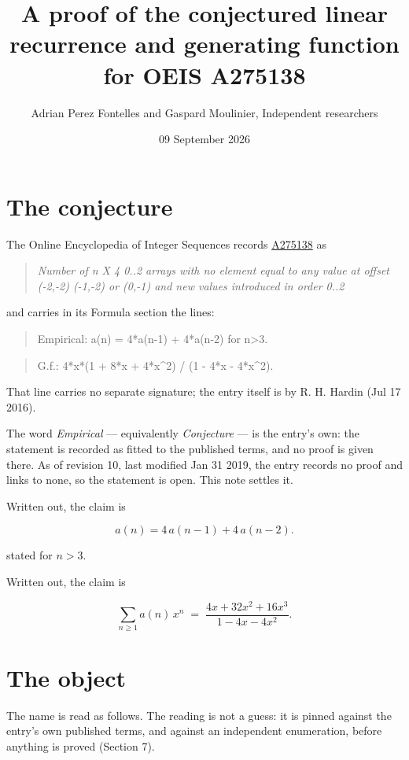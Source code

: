\documentclass[11pt]{article}
\title{A proof of the conjectured linear recurrence and generating function for OEIS A275138}
\author{Adrian Perez Fontelles and Gaspard Moulinier, Independent researchers}
\date{09 September 2026}
\theoremstyle{definition}
\begin{document}
\maketitle
\section{The conjecture}

The Online Encyclopedia of Integer Sequences records \href{https://oeis.org/A275138}{A275138} as

\begin{quote}\itshape Number of n X 4 0..2 arrays with no element equal to any value at offset (-2,-2) (-1,-2) or (0,-1) and new values introduced in order 0..2\end{quote}

and carries in its Formula section the lines:

\begin{quote}\ttfamily Empirical: a(n) = 4*a(n-1) + 4*a(n-2) for n>3.\end{quote}

\begin{quote}\ttfamily G.f.: 4*x*(1 + 8*x + 4*x\textasciicircum{}2) / (1 - 4*x - 4*x\textasciicircum{}2).\end{quote}

That line carries no separate signature; the entry itself is by R. H. Hardin (Jul 17 2016).

The word {\itshape Empirical} --- equivalently {\itshape Conjecture} --- is the entry's own: the statement is recorded as fitted to the published terms, and no proof is given there. As of revision 10, last modified Jan 31 2019, the entry records no proof and links to none, so the statement is open. This note settles it.

Written out, the claim is

\[a(n) = 4\,a(n-1) + 4\,a(n-2).\]

stated for $n > 3$.

Written out, the claim is

\[\sum_{n \ge 1} a(n)\,x^n \;=\; \frac{4x + 32x^{2} + 16x^{3}}{1 - 4x - 4x^{2}}.\]

\section{The object}

The name is read as follows. The reading is not a guess: it is pinned against the entry's own published terms, and against an independent enumeration, before anything is proved (Section 7).
\end{document}
